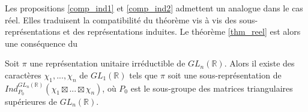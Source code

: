 Les propositions \ref{comp_ind1} et \ref{comp_ind2} admettent un analogue dans le cas réel. Elles traduisent la compatibilité du théorème vis à vis des sous-représentations et des représentations induites. Le théorème \ref{thm_reel} est alors une conséquence du
\begin{theoreme}
Soit $\pi$ une représentation unitaire irréductible de $GL_n(\mathbb{R})$. Alors il existe des caractères $\chi_1, ..., \chi_n$ de $GL_1(\mathbb{R})$ tels que $\pi$ soit une sous-représentation de $Ind_{P_0}^{GL_n(\mathbb{R})}(\chi_1 \boxtimes ... \boxtimes \chi_n)$, où $P_0$ est le sous-groupe des matrices triangulaires supérieures de $GL_n(\mathbb{R})$.
\end{theoreme}